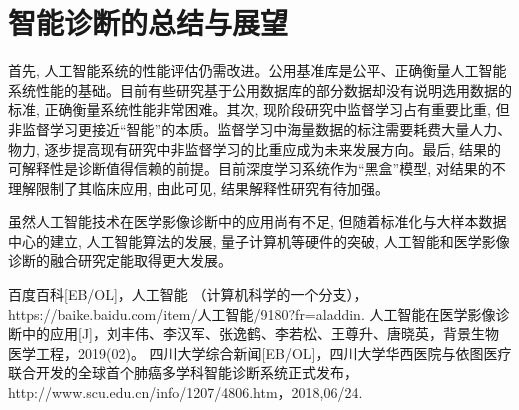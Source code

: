 \documentclass{xcumcmart}
\begin{document}
\section{智能诊断的总结与展望}
\par 首先, 人工智能系统的性能评估仍需改进。公用基准库是公平、正确衡量人工智能系统性能的基础。目前有些研究基于公用数据库的部分数据却没有说明选用数据的标准, 正确衡量系统性能非常困难。其次, 现阶段研究中监督学习占有重要比重, 但非监督学习更接近“智能”的本质。监督学习中海量数据的标注需要耗费大量人力、物力, 逐步提高现有研究中非监督学习的比重应成为未来发展方向。最后, 结果的可解释性是诊断值得信赖的前提。目前深度学习系统作为“黑盒”模型, 对结果的不理解限制了其临床应用, 由此可见, 结果解释性研究有待加强。
\par 虽然人工智能技术在医学影像诊断中的应用尚有不足, 但随着标准化与大样本数据中心的建立, 人工智能算法的发展, 量子计算机等硬件的突破, 人工智能和医学影像诊断的融合研究定能取得更大发展。

\begin{thebibliography}{1}
     百度百科[EB/OL]，人工智能 （计算机科学的一个分支），https://baike.baidu.com/item/人工智能/9180?fr=aladdin.
     人工智能在医学影像诊断中的应用[J]，刘丰伟、李汉军、张逸鹤、李若松、王尊升、唐晓英，背景生物医学工程，2019(02)。
     四川大学综合新闻[EB/OL]，四川大学华西医院与依图医疗联合开发的全球首个肺癌多学科智能诊断系统正式发布，http://www.scu.edu.cn/info/1207/4806.htm，2018,06/24.
\end{thebibliography}
\end{document}
